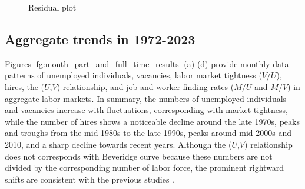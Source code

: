 \documentclass[12pt]{article}
\begin{document}
\begin{figure}[!ht]
  \begin{center}
  \caption{Residual plot}
  \label{fg:residual_plots} 
  \end{center}
  \footnotesize
\end{figure} 




\subsection{Aggregate trends in 1972-2023}\label{sec:month_level}

Figures \ref{fg:month_part_and_full_time_results} (a)-(d) provide monthly data patterns of unemployed individuals, vacancies, labor market tightness (\(V/U\)), hires, the  ($U$,$V$) relationship, and job and worker finding rates (\(M/U\) and \(M/V\)) in aggregate labor markets. 
In summary, the numbers of unemployed individuals and vacancies increase with fluctuations, corresponding with market tightness, while the number of hires shows a noticeable decline around the late 1970s, peaks and troughs from the mid-1980s to the late 1990s, peaks around mid-2000s and 2010, and a sharp decline towards recent years.
Although the ($U$,$V$) relationship does not corresponds with Beveridge curve because these numbers are not divided by the corresponding number of labor force, the prominent rightward shifts are consistent with the previous studies \citep{elsby2015beveridge}.
\end{document}
